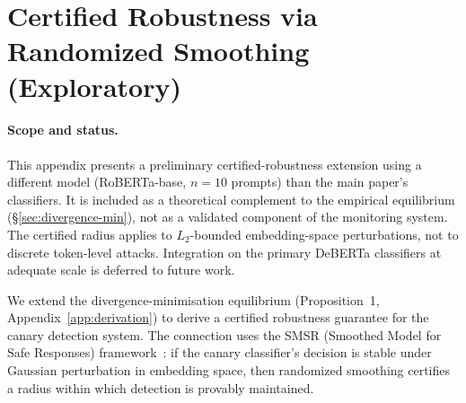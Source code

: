 %

\section{Certified Robustness via Randomized Smoothing (Exploratory)}
\label{sec:smsr-connection}

\paragraph{Scope and status.} This appendix presents a preliminary certified-robustness extension using a different model (RoBERTa-base, $n{=}10$ prompts) than the main paper's classifiers. It is included as a theoretical complement to the empirical equilibrium (\S\ref{sec:divergence-min}), not as a validated component of the monitoring system. The certified radius applies to $L_2$-bounded embedding-space perturbations, not to discrete token-level attacks. Integration on the primary DeBERTa classifiers at adequate scale is deferred to future work.

\medskip

We extend the divergence-minimisation equilibrium (Proposition~1, Appendix~\ref{app:derivation}) to derive a certified robustness guarantee for the canary detection system. The connection uses the SMSR (Smoothed Model for Safe Responses) framework~\citep{cohen2019certified,salman2019provably}: if the canary classifier's decision is stable under Gaussian perturbation in embedding space, then randomized smoothing certifies a radius within which detection is provably maintained.

